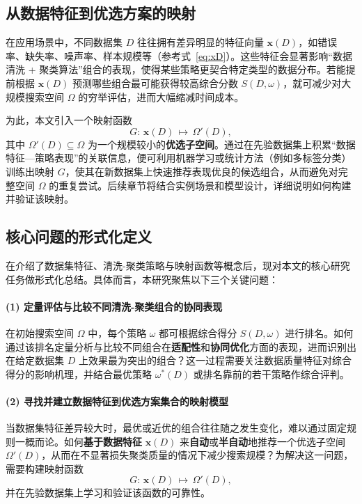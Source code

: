 \documentclass[10pt]{article} %
\numberwithin{equation}{section}
\begin{document}
\subsection{从数据特征到优选方案的映射}
\label{subsec:mapping-model}

在应用场景中，不同数据集 \(D\) 往往拥有差异明显的特征向量 \(\mathbf{x}(D)\)，如错误率、缺失率、噪声率、样本规模等（参考式~\eqref{eq:xD}）。这些特征会显著影响“数据清洗 + 聚类算法”组合的表现，使得某些策略更契合特定类型的数据分布。若能提前根据 \(\mathbf{x}(D)\) 预测哪些组合最可能获得较高综合分数 \(S(D,\omega)\)，就可减少对大规模搜索空间 \(\Omega\) 的穷举评估，进而大幅缩减时间成本。

为此，本文引入一个映射函数
\begin{equation}\label{eq:Omega-prime}
  G:\, \mathbf{x}(D)\,\mapsto\, \Omega'(D),
\end{equation}
其中 \(\Omega'(D)\subseteq \Omega\) 为一个规模较小的\textbf{优选子空间}。通过在先验数据集上积累“数据特征—策略表现”的关联信息，便可利用机器学习或统计方法（例如多标签分类）训练出映射 \(G\)，使其在新数据集上快速推荐表现优良的候选组合，从而避免对完整空间 \(\Omega\) 的重复尝试。后续章节将结合实例场景和模型设计，详细说明如何构建并验证该映射。

\subsection{核心问题的形式化定义}
\label{subsec:problem-formalization}

在介绍了数据集特征、清洗-聚类策略与映射函数等概念后，现对本文的核心研究任务做形式化总结。具体而言，本研究聚焦以下三个关键问题：

\paragraph{(1) 定量评估与比较不同清洗-聚类组合的协同表现}
在初始搜索空间 \(\Omega\) 中，每个策略 \(\omega\) 都可根据综合得分 \(S(D,\omega)\) 进行排名。如何通过该排名定量分析与比较不同组合在\textbf{适配性}和\textbf{协同优化}方面的表现，进而识别出在给定数据集 \(D\) 上效果最为突出的组合？这一过程需要关注数据质量特征对综合得分的影响机理，并结合最优策略 \(\omega^*(D)\) 或排名靠前的若干策略作综合评判。

\paragraph{(2) 寻找并建立数据特征到优选方案集合的映射模型}
当数据集特征差异较大时，最优或近优的组合往往随之发生变化，难以通过固定规则一概而论。如何\textbf{基于数据特征} \(\mathbf{x}(D)\) 来\textbf{自动}或\textbf{半自动}地推荐一个优选子空间 \(\Omega'(D)\)，从而在不显著损失聚类质量的情况下减少搜索规模？为解决这一问题，需要构建映射函数
\[
  G:\,\mathbf{x}(D)\,\mapsto\,\Omega'(D),
\]
并在先验数据集上学习和验证该函数的可靠性。
\end{document}
